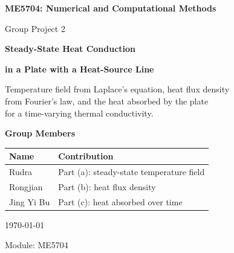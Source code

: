 \begin{titlepage}
\centering

\vspace*{1.5cm}
{\LARGE \textbf{ME5704: Numerical and Computational Methods}\par}
\vspace{0.5cm}
{\Large Group Project 2\par}
\vspace{1.2cm}

{\Huge \textbf{Steady-State Heat Conduction}\par}
\vspace{0.3cm}
{\Huge \textbf{in a Plate with a Heat-Source Line}\par}

\vspace{1.5cm}
{\large Temperature field from Laplace's equation, heat flux density\\
from Fourier's law, and the heat absorbed by the plate\\
for a time-varying thermal conductivity.\par}

\vspace{2.5cm}

{\Large \textbf{Group Members}\par}
\vspace{0.5cm}
\begin{tabular}{ll}
\toprule
\textbf{Name} & \textbf{Contribution} \\
\midrule
Rudra & Part (a): steady-state temperature field \\
Rongjian & Part (b): heat flux density \\
Jing Yi Bu & Part (c): heat absorbed over time \\
\bottomrule
\end{tabular}

\vspace{2.5cm}
{\large \today\par}

\vfill
{\normalsize Module: ME5704 \par}

\end{titlepage}
\setcounter{page}{2}   %
